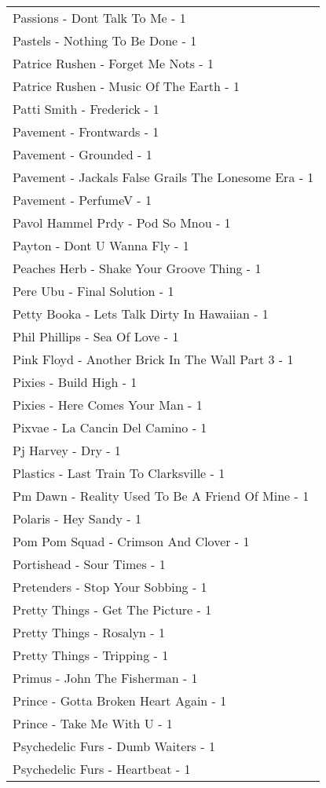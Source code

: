 \documentclass[
]{article}
\begin{document}
\begin{longtable}{l}
Passions - Dont Talk To Me - 1 \\ 
Pastels - Nothing To Be Done - 1 \\ 
Patrice Rushen - Forget Me Nots - 1 \\ 
Patrice Rushen - Music Of The Earth - 1 \\ 
Patti Smith - Frederick - 1 \\ 
Pavement - Frontwards - 1 \\ 
Pavement - Grounded - 1 \\ 
Pavement - Jackals False Grails The Lonesome Era - 1 \\ 
Pavement - PerfumeV - 1 \\ 
Pavol Hammel Prdy - Pod So Mnou - 1 \\ 
Payton - Dont U Wanna Fly - 1 \\ 
Peaches Herb - Shake Your Groove Thing - 1 \\ 
Pere Ubu - Final Solution - 1 \\ 
Petty Booka - Lets Talk Dirty In Hawaiian - 1 \\ 
Phil Phillips - Sea Of Love - 1 \\ 
Pink Floyd - Another Brick In The Wall Part 3 - 1 \\ 
Pixies - Build High - 1 \\ 
Pixies - Here Comes Your Man - 1 \\ 
Pixvae - La Cancin Del Camino - 1 \\ 
Pj Harvey - Dry - 1 \\ 
Plastics - Last Train To Clarksville - 1 \\ 
Pm Dawn - Reality Used To Be A Friend Of Mine - 1 \\ 
Polaris - Hey Sandy - 1 \\ 
Pom Pom Squad - Crimson And Clover - 1 \\ 
Portishead - Sour Times - 1 \\ 
Pretenders - Stop Your Sobbing - 1 \\ 
Pretty Things - Get The Picture - 1 \\ 
Pretty Things - Rosalyn - 1 \\ 
Pretty Things - Tripping - 1 \\ 
Primus - John The Fisherman - 1 \\ 
Prince - Gotta Broken Heart Again - 1 \\ 
Prince - Take Me With U - 1 \\ 
Psychedelic Furs - Dumb Waiters - 1 \\ 
Psychedelic Furs - Heartbeat - 1 \\ 

\end{longtable}
\end{document}
